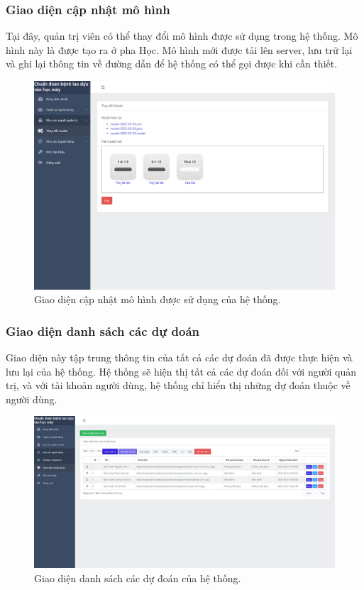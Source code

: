 \subsubsection{Giao diện cập nhật mô hình}
Tại đây, quản trị viên có thể thay đổi mô hình được sử dụng trong hệ thống. Mô hình này là được tạo ra ở pha Học. Mô hình mới được tải lên server, lưu trữ lại và ghi lại thông tin về đường dẫn để hệ thống có thể gọi được khi cần thiết.
\begin{figure}[H]
	\centering
	\includegraphics[width=1\linewidth]{images/quantri_doi_model}
	\caption{Giao diện cập nhật mô hình được sử dụng của hệ thống.}
	\label{fig:quantri_doi_model}
\end{figure}

\subsubsection{Giao diện danh sách các dự doán}
Giao diện này tập trung thông tin của tất cả các dự đoán đã được thực hiện và lưu lại của hệ thống. Hệ thống sẽ hiện thị tất cả các dự đoán đối với người quản trị, và với tài khoản người dùng, hệ thống chỉ hiển thị những dự đoán thuộc về người dùng.
\begin{figure}[H]
	\centering
	\includegraphics[width=0.95\linewidth]{images/user_danh_sach}
	\caption{Giao diện danh sách các dự đoán của hệ thống.}
	\label{fig:user_danh_sach}
\end{figure}

